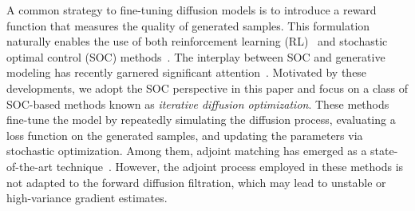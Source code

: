 \documentclass[letterpaper, 10 pt, conference]{ieeeconf}  %
\begin{document}
A common strategy to fine-tuning diffusion models is to introduce a reward function that measures the quality of generated samples. This formulation naturally enables the use of both reinforcement learning (RL)~\cite{fan2023dpok,blacktraining} and stochastic optimal control (SOC) methods~\cite{uehara2024fine,domingoadjoint,tang2024fine}.
The interplay between SOC and generative modeling has recently garnered significant attention~\cite{zhang2022fast,rapakoulias2024go,chen2022likelihood,elamvazhuthi2025flow,mei2025synthesis,Mei2025FlowMatching}.
Motivated by these developments, we adopt the SOC perspective in this paper and focus on a class of SOC-based methods known as \emph{iterative diffusion optimization}\cite{nusken2021solving}. These methods fine-tune the model by repeatedly simulating the diffusion process, evaluating a loss function on the generated samples, and updating the parameters via stochastic optimization. Among them, adjoint matching has emerged as a state-of-the-art technique~\cite{domingoadjoint}. However, the adjoint process employed in these methods is  not adapted to the forward diffusion filtration, which may lead to unstable or high-variance gradient estimates.



\end{document}
